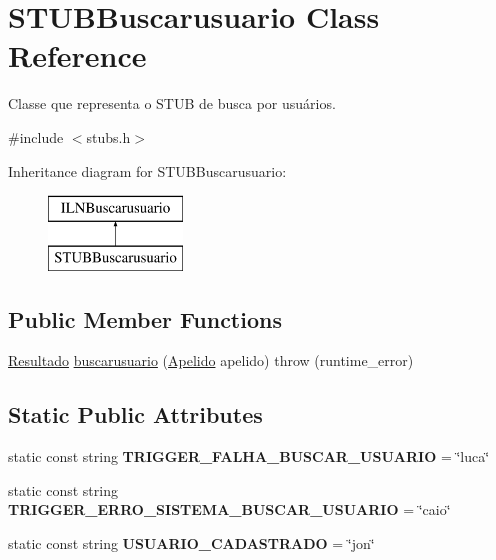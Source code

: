 \hypertarget{classSTUBBuscarusuario}{}\section{S\+T\+U\+B\+Buscarusuario Class Reference}
\label{classSTUBBuscarusuario}


Classe que representa o S\+T\+UB de busca por usuários.  




{\ttfamily \#include $<$stubs.\+h$>$}

Inheritance diagram for S\+T\+U\+B\+Buscarusuario\+:\begin{figure}[H]
\begin{center}
\leavevmode
\includegraphics[height=2.000000cm]{classSTUBBuscarusuario}
\end{center}
\end{figure}
\subsection*{Public Member Functions}
\begin{DoxyCompactItemize}
\item 
\hyperlink{classResultado}{Resultado} \hyperlink{classSTUBBuscarusuario_a560dc5bf8f0a64163502ab496046c985}{buscarusuario} (\hyperlink{classApelido}{Apelido} apelido)  throw (runtime\+\_\+error)
\end{DoxyCompactItemize}
\subsection*{Static Public Attributes}
\begin{DoxyCompactItemize}
\item 
\mbox{\label{classSTUBBuscarusuario_a47c8339e9b3576007afa98a8be1e5ec8}} 
static const string {\bfseries T\+R\+I\+G\+G\+E\+R\+\_\+\+F\+A\+L\+H\+A\+\_\+\+B\+U\+S\+C\+A\+R\+\_\+\+U\+S\+U\+A\+R\+IO} = \char`\"{}luca\char`\"{}
\item 
\mbox{\label{classSTUBBuscarusuario_a7e000fa79422cdd12702bd3e7463d129}} 
static const string {\bfseries T\+R\+I\+G\+G\+E\+R\+\_\+\+E\+R\+R\+O\+\_\+\+S\+I\+S\+T\+E\+M\+A\+\_\+\+B\+U\+S\+C\+A\+R\+\_\+\+U\+S\+U\+A\+R\+IO} = \char`\"{}caio\char`\"{}
\item 
\mbox{\label{classSTUBBuscarusuario_ac1b3a0f4334da571cb8cb89b2ad57643}} 
static const string {\bfseries U\+S\+U\+A\+R\+I\+O\+\_\+\+C\+A\+D\+A\+S\+T\+R\+A\+DO} = \char`\"{}jon\char`\"{}
\end{DoxyCompactItemize}


